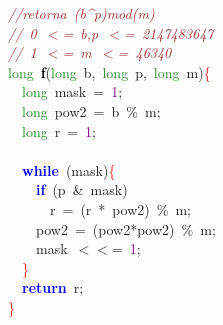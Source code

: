 \noindent
\mbox{}\textit{\textcolor{Brown}{//retorna\ (b\textasciicircum{}p)mod(m)}} \\
\mbox{}\textit{\textcolor{Brown}{//\ 0\ $<$=\ b,p\ $<$=\ 2147483647}} \\
\mbox{}\textit{\textcolor{Brown}{//\ 1\ $<$=\ m\ $<$=\ 46340}} \\
\mbox{}\textcolor{ForestGreen}{long}\ \textbf{\textcolor{Black}{f}}\textcolor{BrickRed}{(}\textcolor{ForestGreen}{long}\ b\textcolor{BrickRed}{,}\ \textcolor{ForestGreen}{long}\ p\textcolor{BrickRed}{,}\ \textcolor{ForestGreen}{long}\ m\textcolor{BrickRed}{)}\textcolor{Red}{\{} \\
\mbox{}\ \ \textcolor{ForestGreen}{long}\ mask\ \textcolor{BrickRed}{=}\ \textcolor{Purple}{1}\textcolor{BrickRed}{;} \\
\mbox{}\ \ \textcolor{ForestGreen}{long}\ pow2\ \textcolor{BrickRed}{=}\ b\ \textcolor{BrickRed}{\%}\ m\textcolor{BrickRed}{;} \\
\mbox{}\ \ \textcolor{ForestGreen}{long}\ r\ \textcolor{BrickRed}{=}\ \textcolor{Purple}{1}\textcolor{BrickRed}{;} \\
\mbox{} \\
\mbox{}\ \ \textbf{\textcolor{Blue}{while}}\ \textcolor{BrickRed}{(}mask\textcolor{BrickRed}{)}\textcolor{Red}{\{} \\
\mbox{}\ \ \ \ \textbf{\textcolor{Blue}{if}}\ \textcolor{BrickRed}{(}p\ \textcolor{BrickRed}{\&}\ mask\textcolor{BrickRed}{)} \\
\mbox{}\ \ \ \ \ \ r\ \textcolor{BrickRed}{=}\ \textcolor{BrickRed}{(}r\ \textcolor{BrickRed}{*}\ pow2\textcolor{BrickRed}{)}\ \textcolor{BrickRed}{\%}\ m\textcolor{BrickRed}{;} \\
\mbox{}\ \ \ \ pow2\ \textcolor{BrickRed}{=}\ \textcolor{BrickRed}{(}pow2\textcolor{BrickRed}{*}pow2\textcolor{BrickRed}{)}\ \textcolor{BrickRed}{\%}\ m\textcolor{BrickRed}{;} \\
\mbox{}\ \ \ \ mask\ \textcolor{BrickRed}{$<$$<$=}\ \textcolor{Purple}{1}\textcolor{BrickRed}{;} \\
\mbox{}\ \ \textcolor{Red}{\}} \\
\mbox{}\ \ \textbf{\textcolor{Blue}{return}}\ r\textcolor{BrickRed}{;} \\
\mbox{}\textcolor{Red}{\}} \\

